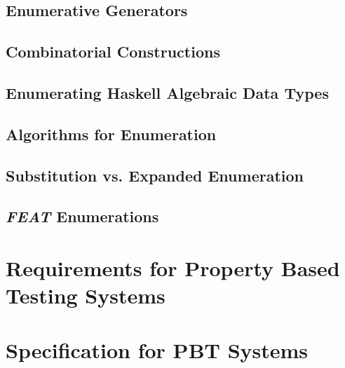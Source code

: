 \documentclass[11pt]{report}
\newcommand{\FEAT}{\textit{FEAT}\xspace}
\begin{document}
\section{Enumerative Generators}\label{sec:enumerations}


\section{Combinatorial Constructions}\label{sec:combconstructs}


\section{Enumerating Haskell Algebraic Data Types}


\section{Algorithms for Enumeration}\label{sec:iterenumalg}


\section{Substitution vs. Expanded Enumeration}



\section{\FEAT Enumerations}





\setcounter{figure}{0}
\setcounter{equation}{0}
\setcounter{table}{0}
\chapter{Requirements for Property Based Testing Systems}\label{chap:requirements}



\setcounter{figure}{0}
\setcounter{equation}{0}
\setcounter{table}{0}
\chapter{Specification for PBT Systems}


%
%
%
\end{document}
